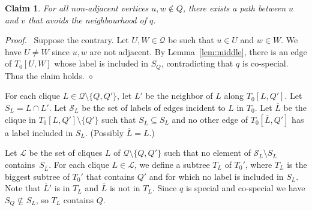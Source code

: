 \documentclass[11pt]{article}
\newtheorem{claim}{Claim}
\newenvironment{proofcl}{\noindent \emph{Proof.}\ }{Thus the claim
holds.  \hfill $\diamond$\vspace{1em}}
\begin{document}
\begin{claim}\label{clq}
     For all non-adjacent vertices $u,w\notin Q$, there exists a path
     between $u$ and $v$ that avoids the neighbourhood of $q$.
\end{claim}
\begin{proofcl}
Suppose the contrary.  Let $U, W\in \mathcal Q$ be such that $u\in U$
and $w\in W$.  We have $U\neq W$ since $u, w$ are not adjacent.  By
Lemma~\ref{lem:middle}, there is an edge of $T_0[U, W]$ whose label is
included in $S_Q$, contradicting that $q$ is co-special.
\end{proofcl}

For each clique $L \in \mathcal Q\setminus \{Q, Q'\}$, let $L'$ be the
neighbor of $L$ along $T_0[L, Q']$.  Let $S_L=L\cap L'$.  Let
$\mathcal S_L$ be the set of labels of edges incident to $L$ in $T_0$.
Let $\overline L$ be the clique in $T_0[L, Q']\setminus \{Q'\}$ such
that $S_{\overline L}\subseteq S_L$ and no other edge of
$T_0[\overline L, Q']$ has a label included in $S_L$.  (Possibly
$\overline L = L$.)

Let $\mathcal L$ be the set of cliques $L$ of $\mathcal Q\setminus
\{Q, Q'\}$ such that no element of $\mathcal S_L\setminus S_L$
contains~$S_{\overline L}$.  For each clique $L \in \mathcal L$, we
define a subtree $T_L$ of $T_0'$, where $T_L$ is the biggest subtree
of $T_0'$ that contains $Q'$ and for which no label is included in
$S_L$.  Note that $\overline L'$ is in $T_L$ and $\overline L$ is not
in $T_L$.  Since $q$ is special and co-special we have $S_Q\nsubseteq
S_L$, so $T_L$ contains $Q$.
\end{document}
